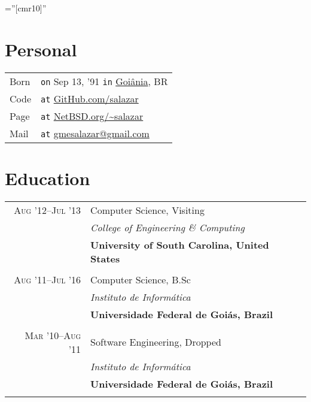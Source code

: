 \documentclass[a4paper,10pt]{article}
\begin{document}
\font\fb=''[cmr10]''

\par{\bigskip\par\vspace{8ex}}

\section{Personal}
\begin{tabular}{l@{\hskip 0.2cm}l}
  Born & \texttt{on} Sep 13, '91 \texttt{in}
                     \href{https://en.wikipedia.org/wiki/Goiania}{Goiânia}, BR \\
  Code & \texttt{at} \href{https://www.github.com/salazar/}
                          {GitHub.com/salazar} \\
  Page & \texttt{at} \href{https://www.netbsd.org/~salazar}
                          {NetBSD.org/\textasciitilde salazar} \\
  Mail & \texttt{at} \href{mailto:gmesalazar@gmail.com}
                          {gmesalazar@gmail.com}
\end{tabular}

\section{Education}
\begin{tabular}{r|p{11cm}}

  \textsc{Aug '12--Jul '13} & Computer Science, Visiting\\ &
  \emph{College of Engineering \& Computing}\\ &
  \textbf{University of South Carolina, United States}
  \\\multicolumn{2}{c}{} \\

  \textsc{Aug '11--Jul '16} & Computer Science, B.Sc\\ &
  \emph{Instituto de Informática}\\ &
  \textbf{Universidade Federal de Goiás, Brazil}
  \\\multicolumn{2}{c}{} \\

  \textsc{Mar '10--Aug '11} & Software Engineering, Dropped \\ &
  \emph{Instituto de Informática}\\ &
  \textbf{Universidade Federal de Goiás, Brazil}
  \\\multicolumn{2}{c}{}

\end{tabular}
\end{document}
